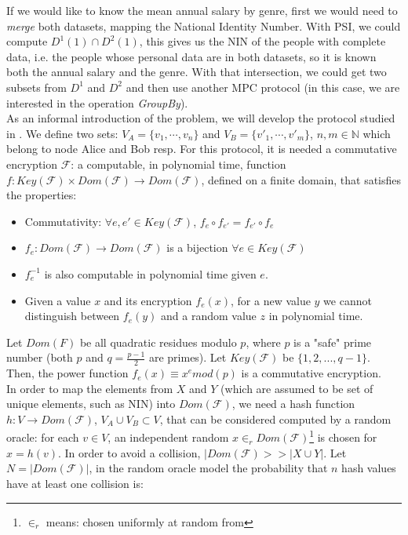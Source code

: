 \vspace*{1 em}

If we would like to know the mean annual salary by genre, first we would need to \textit{merge} both datasets, mapping the National Identity Number.
With PSI, we could compute $D^1(1) \cap D^2(1)$, this  gives us the NIN of the people with complete data, i.e. the people whose personal data are in both datasets, so it is known both the annual salary and the genre.
With that intersection, we could get two subsets from $D^1$ and $D^2$ and then use another MPC protocol (in this case, we are interested in the operation \textit{GroupBy}).\\

As an informal introduction of the problem, we will develop the protocol studied in \cite{agrawal}. We define two sets: $V_A = \{v_1,\cdots, v_n\}$ and $V_B = \{v'_1,\cdots, v'_m\}$, $n,m\in\mathbb{N}$ which belong to node Alice and Bob resp.
For this protocol, it is needed a commutative encryption $\mathcal{F}$: a computable, in polynomial time, function $f \colon Key(\mathcal{F}) \times Dom(\mathcal{F}) \to Dom(\mathcal{F})$, defined on a finite domain, that satisfies the properties:

\begin{itemize}
    \item Commutativity: $\forall e, e' \in Key(\mathcal{F})$, $f_e \circ f_{e'} = f_{e'} \circ f_e$
    \item $f_e \colon Dom(\mathcal{F}) \to Dom(\mathcal{F})$ is a bijection $\forall e \in Key(\mathcal{F})$
    \item $f_e^{-1}$ is also computable in polynomial time given $e$.
    \item Given a value $x$ and its encryption $f_e (x)$, for a new value $y$ we cannot distinguish between $f_e(y)$ and a random value $z$ in polynomial time.
\end{itemize}

Let $Dom(F)$ be all quadratic residues modulo $p$, where $p$ is a "safe" prime number (both $p$ and $q = \frac{p-1}{2}$ are primes). Let $Key(\mathcal{F})$ be $\{1,2,...,q-1\}$. Then, the power function $f_e(x) \equiv x^e mod(p)$ is a commutative encryption.\\
In order to map the elements from $X$ and $Y$ (which are assumed to be set of unique elements, such as NIN) into $Dom(\mathcal{F})$, we need a hash function $h \colon V \to Dom(\mathcal{F})$, $V_A \cup V_B \subset V$, that can be considered computed by a random oracle: for each $v \in V$, an independent random $x \in_r Dom(\mathcal{F})$\footnote{$\in_r$ means: chosen uniformly at random from} is chosen for $x = h(v)$.
In order to avoid a collision, $|Dom(\mathcal{F}) >> |X \cup Y|$. Let $N = |Dom(\mathcal{F})|$, in the random oracle model the probability that $n$ hash values have at least one collision is:

